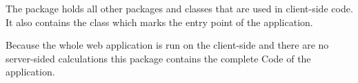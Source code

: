 The \texttt{}package holds all other packages and classes that are used in client-side code. 
It also contains the \texttt{} class which marks the entry point of the application.

Because the whole web application is run on the client-side and there are no server-sided calculations 
this package contains the complete Code of the application.
